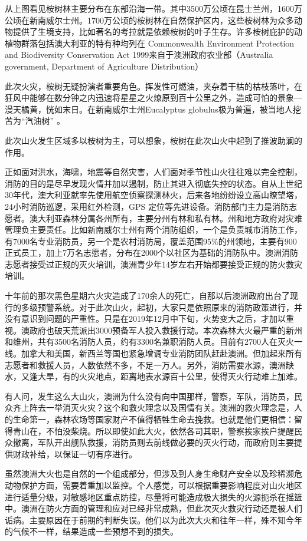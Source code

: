 \documentclass[
]{book}
\begin{document}
从上图看见桉树林主要分布在东部沿海一带。其中3500万公顷在昆士兰州，1600万公顷在新南威尔士州。1700万公顷的桉树林在自然保护区内，这些桉树林为众多动物提供了生境支持，比如著名的考拉就是依赖桉树的叶子生存。许多桉树庇护的动植物群落包括澳大利亚的特有种均列在 Commonwealth Environment Protection and Biodiversity Conservation Act 1999来自于澳洲政府农业部（Australia government, Department of Agriculture Distribution）

此次火灾，桉树无疑扮演者重要角色。挥发性可燃油，夹杂着干枯的枯枝落叶，在狂风中能够在数分钟之内迅速将星星之火燎原到百十公里之外，造成可怕的景象---漫天橘黄，恍如末日。在新南威尔士州Eucalyptus globulus极为普遍，被当地人挖苦为``汽油树'' 。

此次山火发生区域多以桉树为主，可以想象，桉树在此次山火中起到了推波助澜的作用。

正如面对洪水，海啸，地震等自然灾害，人们面对季节性山火往往难以完全控制，消防的目的是尽早发现火情并加以遏制，防止其进入彻底失控的状态。自从上世纪30年代，澳大利亚就率先使用航空侦察探测林火，后来各地纷纷设立高山瞭望塔，24小时消防巡逻，采用红外检测，GPS 定位等先进设备。消防部门主力是消防志愿者。澳大利亚森林分属各州所有，主要分州有林和私有林。州和地方政府对灾难管理负主要责任。比如新南威尔士州有两个消防组织，一个是负责城市消防工作，有7000名专业消防员，另一个是农村消防局，覆盖范围95\%的州领地，主要有900正式员工，加上7万名志愿者，分布在2000个以社区为基础的消防队中。澳洲消防志愿者接受过正规的灭火培训，澳洲青少年14岁左右开始都要接受正规的防火救灾培训。

十年前的那次黑色星期六火灾造成了170余人的死亡，自那以后澳洲政府出台了现行的多级预警系统。对于此次山火，起初，大家只是依照原来的消防政策进行，并没有意识到问题的严重性。只是在2019年12月中下旬，火势变大之后，才加以重视。澳政府也破天荒派出3000预备军人投入救援行动。本次森林大火最严重的新州和维州，共有3500名消防人员，约有3300名兼职消防人员。目前有2700人在灭火一线。加拿大和美国，新西兰等国也紧急增调专业消防团队赶赴澳洲。但加起来所有志愿者和救援人员，人数依然不多，不足一万人。另外，消防需要水源，澳洲缺水，又逢大旱，有的火灾地点，距离地表水源百十公里，使得灭火行动难上加难。

有人问，发生这么大山火，澳洲为什么没有向中国那样，警察，军队，消防员，民众齐上阵去一举消灭火灾？这个和救火理念以及国情有关。澳洲的救火理念是，人的生命第一，森林农场等国家财产不值得牺牲生命去挽救。也就是他们更相信：留得青山在，不怕没柴烧。所以即使如此大火，依然各司其职，警察挨家挨户提醒民众撤离，军队开出舰队救援，消防员则去前线做必要的灭火行动，而政府则主要提供财政补给，以保证一切有序进行。

虽然澳洲大火也是自然的一个组成部分，但涉及到人身生命财产安全以及珍稀濒危动物保护方面，需要着重加以监控。个人感觉，可以根据重要影响程度对山火地区进行适量分级，对敏感地区重点防控，尽量将可能造成极大损失的火源扼杀在摇篮中。澳洲在防火方面的管理和应对已经非常成熟，但此次灭火救灾行动还是被人们诟病。主要原因在于前期的判断失误。他们以为此次大火和往年一样，殊不知今年的气候不一样，结果造成一些预想不到的损失。
\end{document}
